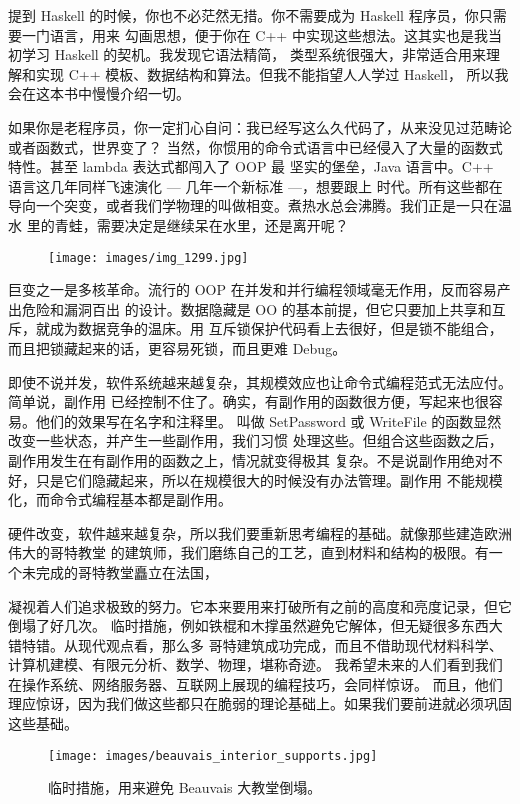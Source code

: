 提到 Haskell 的时候，你也不必茫然无措。你不需要成为 Haskell 程序员，你只需要一门语言，用来
勾画思想，便于你在 C++ 中实现这些想法。这其实也是我当初学习 Haskell 的契机。我发现它语法精简，
类型系统很强大，非常适合用来理解和实现 C++ 模板、数据结构和算法。但我不能指望人人学过 Haskell，
所以我会在这本书中慢慢介绍一切。

如果你是老程序员，你一定扪心自问：我已经写这么久代码了，从来没见过范畴论或者函数式，世界变了？
当然，你惯用的命令式语言中已经侵入了大量的函数式特性。甚至 lambda 表达式都闯入了 OOP 最
坚实的堡垒，Java 语言中。C++ 语言这几年同样飞速演化 --- 几年一个新标准 ---，想要跟上
时代。所有这些都在导向一个突变，或者我们学物理的叫做相变。煮热水总会沸腾。我们正是一只在温水
里的青蛙，需要决定是继续呆在水里，还是离开呢？

\begin{figure}[H]
  \centering
  \texttt{[image: images/img\_1299.jpg]}
\end{figure}

\noindent

巨变之一是多核革命。流行的 OOP 在并发和并行编程领域毫无作用，反而容易产出危险和漏洞百出
的设计。数据隐藏是 OO 的基本前提，但它只要加上共享和互斥，就成为数据竞争的温床。用
互斥锁保护代码看上去很好，但是锁不能组合，而且把锁藏起来的话，更容易死锁，而且更难 Debug。

即使不说并发，软件系统越来越复杂，其规模效应也让命令式编程范式无法应付。简单说，副作用
已经控制不住了。确实，有副作用的函数很方便，写起来也很容易。他们的效果写在名字和注释里。
叫做 SetPassword 或 WriteFile 的函数显然改变一些状态，并产生一些副作用，我们习惯
处理这些。但组合这些函数之后，副作用发生在有副作用的函数之上，情况就变得极其
复杂。不是说副作用绝对不好，只是它们隐藏起来，所以在规模很大的时候没有办法管理。副作用
不能规模化，而命令式编程基本都是副作用。

硬件改变，软件越来越复杂，所以我们要重新思考编程的基础。就像那些建造欧洲伟大的哥特教堂
的建筑师，我们磨练自己的工艺，直到材料和结构的极限。有一个未完成的哥特教堂矗立在法国，


凝视着人们追求极致的努力。它本来要用来打破所有之前的高度和亮度记录，但它倒塌了好几次。
临时措施，例如铁棍和木撑虽然避免它解体，但无疑很多东西大错特错。从现代观点看，那么多
哥特建筑成功完成，而且不借助现代材料科学、计算机建模、有限元分析、数学、物理，堪称奇迹。
我希望未来的人们看到我们在操作系统、网络服务器、互联网上展现的编程技巧，会同样惊讶。
而且，他们理应惊讶，因为我们做这些都只在脆弱的理论基础上。如果我们要前进就必须巩固
这些基础。

\begin{figure}
  \centering
  \texttt{[image: images/beauvais\_interior\_supports.jpg]}
  \caption{临时措施，用来避免 Beauvais 大教堂倒塌。}
\end{figure}
